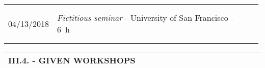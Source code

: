 \documentclass[11pt, letterpaper]{extarticle}
\begin{document}
	\begin{longtable}{C{0.154\linewidth}C{0.834\linewidth}N}
		                                                             &                                                                                                                                                                                                                                                  & \\[-0.25cm]
		                                                             &                                                                                                                                                                                                                                                  & \\[-0.25cm]
		04/13/2018                                                   & \textit{Fictitious seminar} - University of San Francisco - 6~h                                                                                                                                                                                  & \\
		                                                             &                                                                                                                                                                                                                                                  & \\[-0.25cm]
		                                                             &                                                                                                                                                                                                                                                  & \\[-0.25cm] \hline
	\end{longtable}


	\label{sec:III.4.}
	\begin{longtable}{C{1.012\linewidth}N}
		\textbf{\large III.4. - GIVEN WORKSHOPS} & \\[0.70cm] \hline
	\end{longtable}
\end{document}
